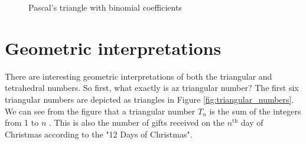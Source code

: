 \documentclass{article}
\theoremstyle{definition}
\begin{document}
\vspace{1em}
%
%
\def \nrows {14}                                                 		%
%
%
%
\begin{figure}[H]                                                       %
  \centering                                                            %
   \resizebox{0.65 \textwidth}{!} {                                     %
   }                                                                    %
  \caption{Pascal's triangle with binomial coefficients}
  \label{fig:pascals_triangle_with_binomial_coefficients}
\end{figure}


\section{Geometric interpretations}
\label{sec:geometric_interpretation}
There are interesting geometric interpretations of both the
triangular and tetrahedral numbers. So first, what exactly is az
triangular number?  The first six triangular numbers are depicted
as triangles in Figure \ref{fig:triangular_numbers}.  We can see
from the figure that a triangular number $T_n$ is the sum of the
integers from 1 to $n$ \cite{wiki:triangle_numbers}.  This is
also the number of gifts received on the $n^{\text{th}}$ day of
Christmas according to the "12 Days of Christmas".
  
\end{document}
